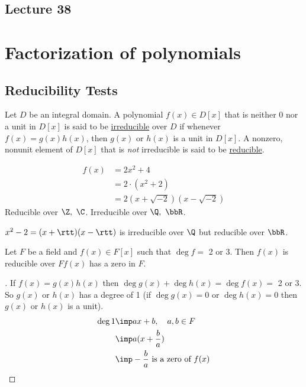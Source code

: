 \documentclass[a4paper]{article}
\begin{document}
\subsection*{Lecture 38} %
\section{Factorization of polynomials}
\subsection{Reducibility Tests}
\begin{definition}
  Let \( D \) be an integral domain.
  A polynomial \( f(x)\in D[x] \) that is neither 0 nor a unit in \( D[x] \) is said to be \uline{irreducible} over \( D \) if whenever \( f(x) = g(x)h(x) \), then \( g(x) \) or \( h(x) \) is a unit in \( D[x] \). A nonzero, nonunit element of \( D[x] \) that is \emph{not} irreducible is said to be \uline{reducible}.
\end{definition}

\begin{example}
  \begin{align*}
    f(x) &= 2x^2 + 4 \\ &= 2\cdot (x^2+2) \\ &= 2(x+\sqrt{-2})(x-\sqrt{-2})
  \end{align*}
  Reducible over \( \Z,\ \C \). Irreducible over \( \Q,\ \bbR \).
\end{example}

\begin{example}
  \( x^2-2 = (x+\rtt)(x-\rtt) \) is irreducible over \( \Q \) but reducible over \( \bbR \).
\end{example}

\begin{theorem}
  Let \( F \) be a field and \( f(x) \in F[x] \) such that \( \deg f =\) 2 or 3.
  Then \( f(x) \) is reducible over \( F \)\iff \( f(x) \) has a zero in \( F \).
\end{theorem}

\begin{proof}[]
  If \( f(x) = g(x)h(x) \) then \( \deg g(x) + \deg h(x) = \deg f(x) = \) 2 or 3.
  So \( g(x) \) or \( h(x) \) has a degree of 1 (if \( \deg g(x) = 0 \) or \( \deg h(x) = 0 \) then \( g(x) \) or \( h(x) \) is a unit).
  \begin{align*}
    \deg 1 &\imp ax+b,\quad a,b\in F \\
           &\imp a(x+\frac{b}{a}) \\
           &\imp -\frac{b}{a} \text{ is a zero of } f(x)
  \end{align*}
\end{proof}
\end{document}
